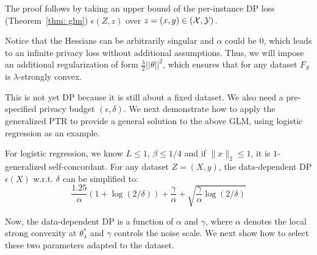 The proof follows by taking an  upper bound of the per-instance DP loss (Theorem~\ref{thm: glm}) $\epsilon(Z,z)$ over $z=(x,y)\in (\mathcal{X}, \mathcal{Y})$. 



Notice that the Hessians can be arbitrarily singular and $\alpha$ could be $0$, which leads to an infinite privacy loss without additional assumptions. Thus, we will impose an additional regularization of form $\frac{\lambda}{2}||\theta||^2$, which ensures that for any dataset $F_S$ is $\lambda$-strongly convex.


 



This is not yet DP because it is still about a fixed  dataset. We also need a pre-specified privacy budget $(\epsilon,\delta)$.
We next demonstrate how to apply the generalized PTR to provide a general solution to the above GLM, using logistic regression as an example.

 
 \begin{remark}\label{remark: log}
 	For logistic regression, we know $L\leq 1$, $\beta \leq 1/4$ and if $\|x\|_2 \leq 1$, it is $1$-generalized self-concordant. For any dataset $Z=(X, y)$, the data-dependent DP $\epsilon(X)$ w.r.t. $\delta$ can be simplified to:
 	$$
 	\frac{1.25}{\alpha}(1+\log(2/\delta)) +\frac{\gamma}{\alpha} +   \sqrt{\frac{\gamma}{\alpha}\log(2/\delta)}
 	$$
 \end{remark}
Now, the data-dependent DP is a function of $\alpha$ and $\gamma$, where $\alpha$ denotes the local strong convexity at $\theta_\lambda^*$ and $\gamma$ controls the  noise scale. We next show how to select these two parameters adapted to the dataset. 


